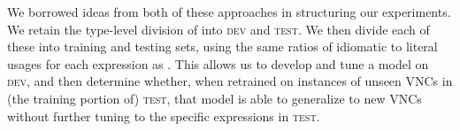 \documentclass[11pt,a4paper]{article}
\newcommand{\dev}{\textsc{dev}\xspace}
\newcommand{\test}{\textsc{test}\xspace}
\begin{document}


We borrowed ideas from both of these approaches in structuring our
experiments. We retain the type-level division of 
 into \dev and \test. We then divide each of
these into training and testing sets, using the same ratios of
idiomatic to literal usages for each expression as
.
This allows us to develop and tune a model on \dev, and then determine
whether, when retrained on instances of unseen VNCs in (the training
portion of) \test, that model is able to generalize to new VNCs
without further tuning to the specific expressions in \test.


\end{document}
